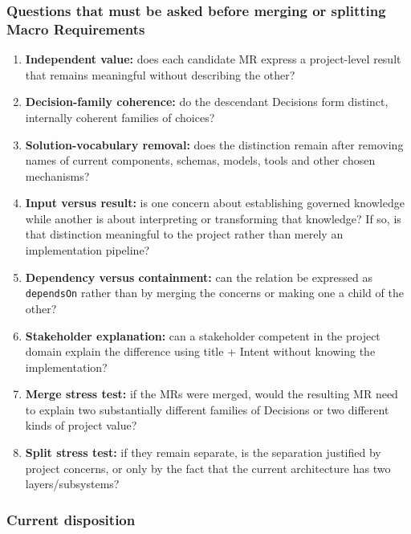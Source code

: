 \documentclass[
  10pt,
]{article}
\providecommand{\tightlist}{%
  \setlength{\itemsep}{0pt}\setlength{\parskip}{0pt}}
\begin{document}
\subsubsection{Questions that must be asked before merging or splitting
Macro
Requirements}\label{questions-that-must-be-asked-before-merging-or-splitting-macro-requirements}

\begin{enumerate}
\def\labelenumi{\arabic{enumi}.}
\tightlist
\item
  \textbf{Independent value:} does each candidate MR express a
  project-level result that remains meaningful without describing the
  other?
\item
  \textbf{Decision-family coherence:} do the descendant Decisions form
  distinct, internally coherent families of choices?
\item
  \textbf{Solution-vocabulary removal:} does the distinction remain
  after removing names of current components, schemas, models, tools and
  other chosen mechanisms?
\item
  \textbf{Input versus result:} is one concern about establishing
  governed knowledge while another is about interpreting or transforming
  that knowledge? If so, is that distinction meaningful to the project
  rather than merely an implementation pipeline?
\item
  \textbf{Dependency versus containment:} can the relation be expressed
  as \texttt{dependsOn} rather than by merging the concerns or making
  one a child of the other?
\item
  \textbf{Stakeholder explanation:} can a stakeholder competent in the
  project domain explain the difference using title + Intent without
  knowing the implementation?
\item
  \textbf{Merge stress test:} if the MRs were merged, would the
  resulting MR need to explain two substantially different families of
  Decisions or two different kinds of project value?
\item
  \textbf{Split stress test:} if they remain separate, is the separation
  justified by project concerns, or only by the fact that the current
  architecture has two layers/subsystems?
\end{enumerate}

\subsubsection{Current disposition}\label{current-disposition}
\end{document}
